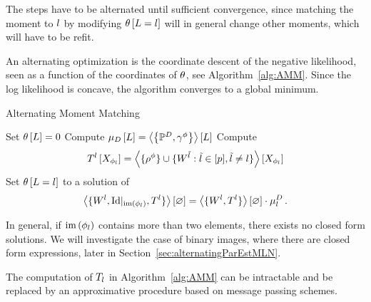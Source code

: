 The steps have to be alternated until sufficient convergence, since matching the moment to $l$ by modifying $\theta\left[L=l\right]$ will in general change other moments, which will have to be refit.


An alternating optimization is the coordinate descent of the negative likelihood, seen as a function of the coordinates of $\theta$, see Algorithm~\ref{alg:AMM}.
Since the log likelihood is concave, the algorithm converges to a global minimum.





\begin{algorithm}[h!]
\caption{Alternating Moment Matching}\label{alg:AMM}
\begin{algorithmic}
\State Set $\theta\left[L\right]=0$
\State Compute $\mu_{D}\left[L\right]= \left\langle \left\{\mathbb{P}^{D},\gamma^{\phi}\right\}\right\rangle \left[ L \right]$
{}
\For{$\statenumeratorin$}
	\State Compute 
		\begin{align*}
			T^{l}\left[X_{\phi_l}\right] 
			= \left\langle \{\rho^{\phi}\}\cup\{W^{\tilde{l}} : \tilde{l} \in [p], \tilde{l}\neq l\}\right\rangle \left[ X_{\phi_l} \right] 
		\end{align*}
	\State Set $\theta\left[L=l\right]$ to a solution of 
	\begin{align*}
		\left\langle \{W^{l}, \mathrm{Id}|_{\mathrm{im}\left(\phi_l\right)}, T^{l} \}\right\rangle \left[ \varnothing \right]
		= \left\langle \{W^{l},T^{l} \}\right\rangle \left[ \varnothing \right] \cdot \mu_l^{D} \, . 
	\end{align*}
\EndFor
\EndWhile
\end{algorithmic}
\end{algorithm}


% 
In general, if $\mathrm{im}\left(\phi_l\right)$ contains more than two elements, there exists no closed form solutions.
We will investigate the case of binary images, where there are closed form expressions, later in Section~\ref{sec:alternatingParEstMLN}.


%
The computation of $T_l$ in Algorithm~\ref{alg:AMM} can be intractable and be replaced by an approximative procedure based on message passing schemes.


